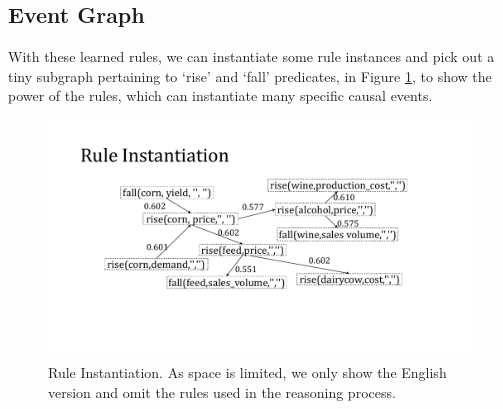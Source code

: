 \subsection{Event Graph}
With these learned rules, we can instantiate some rule instances and pick out a tiny subgraph pertaining to `rise' and `fall' predicates, in Figure \ref{fig:rule_instantiation_graph}, to show the power of the rules, which can instantiate many specific causal events. 

\begin{figure}[htbp]
\begin{center}
	\includegraphics[width=0.9\columnwidth]{figures/event_graph}
\end{center}
\caption{Rule Instantiation. As space is limited, we only show the English version and omit the rules used in the reasoning process.}
\label{fig:rule_instantiation_graph}
\end{figure}

